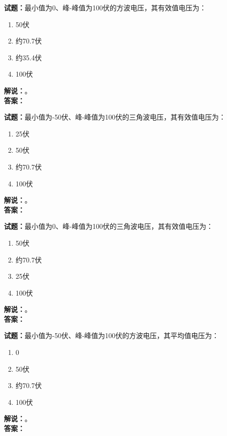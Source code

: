 \documentclass{ctexbook}
\begin{document}
\bigskip




\noindent\textbf{试题：}最小值为0、峰-峰值为100伏的方波电压，其有效值电压为：
\begin{enumerate}[leftmargin=3em]
\item 50伏
\item 约70.7伏
\item 约35.4伏
\item 100伏
\end{enumerate}
\noindent\textbf{解说：}\textbf{}。\\\noindent\textbf{答案：}

\bigskip




\noindent\textbf{试题：}最小值为-50伏、峰-峰值为100伏的三角波电压，其有效值电压为：
\begin{enumerate}[leftmargin=3em]
\item 25伏
\item 50伏
\item 约70.7伏
\item 100伏
\end{enumerate}
\noindent\textbf{解说：}\textbf{}。\\\noindent\textbf{答案：}

\bigskip




\noindent\textbf{试题：}最小值为0、峰-峰值为100伏的三角波电压，其有效值电压为：
\begin{enumerate}[leftmargin=3em]
\item 50伏
\item 约70.7伏
\item 25伏
\item 100伏
\end{enumerate}
\noindent\textbf{解说：}\textbf{}。\\\noindent\textbf{答案：}

\bigskip




\noindent\textbf{试题：}最小值为-50伏、峰-峰值为100伏的方波电压，其平均值电压为：
\begin{enumerate}[leftmargin=3em]
\item 0
\item 50伏
\item 约70.7伏
\item 100伏
\end{enumerate}
\noindent\textbf{解说：}\textbf{}。\\\noindent\textbf{答案：}
\end{document}
